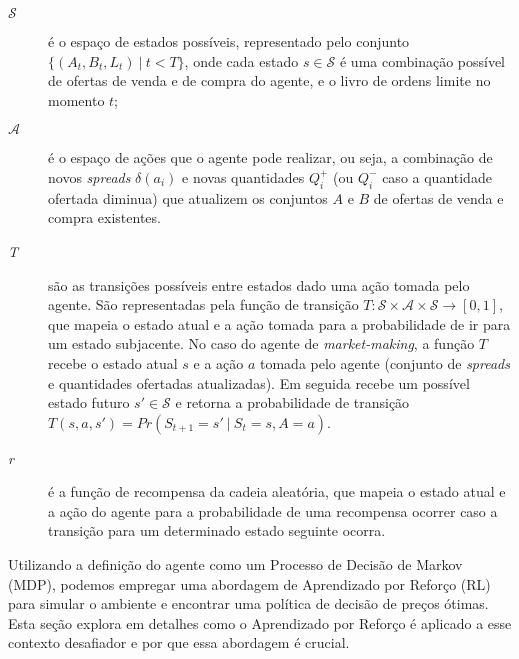 \begin{description}
	\item[$\mathcal{S}$] 
	é o espaço de estados possíveis, representado pelo conjunto $\{(A_{t}, B_{t}, L_{t}) \ | \ t < T\}$, onde cada estado $s \in \mathcal{S}$ é uma combinação possível de ofertas de venda e de compra do agente, e o livro de ordens limite no momento $t$;
	\item[$\mathcal{A}$] é o espaço de ações que o agente pode realizar, ou seja, a combinação de novos \textit{spreads} $\delta(a_{i})$ e novas quantidades $Q^{+}_{i}$ (ou $Q^{-}_{i}$ caso a quantidade ofertada diminua) que atualizem os conjuntos $A$ e $B$ de ofertas de venda e compra existentes.
	\item[\textit{T}] são as transições possíveis entre estados dado uma ação tomada pelo agente. São representadas pela função de transição $T :  \mathcal{S} \times \mathcal{A} \times \mathcal{S} \rightarrow [0, 1]$, que mapeia o estado atual e a ação tomada para a probabilidade de ir para um estado subjacente. No caso do agente de \textit{market-making}, a função $T$ recebe o estado atual $s$ e a ação $a$ tomada pelo agente (conjunto de \textit{spreads} e quantidades ofertadas atualizadas). Em seguida recebe um possível estado futuro $s' \in \mathcal{S}$ e retorna a probabilidade de transição $T(s, a, s') = Pr(S_{t+1} = s' \ | \ S_{t} = s, A = a)$.
	\item[\textit{r}] é a função de recompensa da cadeia aleatória, que mapeia o estado atual e a ação do agente para a probabilidade de uma recompensa ocorrer caso a transição para um determinado estado seguinte ocorra.
\end{description}

Utilizando a definição do agente como um Processo de Decisão de Markov (MDP), podemos empregar uma abordagem de Aprendizado por Reforço (RL) para simular o ambiente e encontrar uma política de decisão de preços ótimas. Esta seção explora em detalhes como o Aprendizado por Reforço é aplicado a esse contexto desafiador e por que essa abordagem é crucial.

